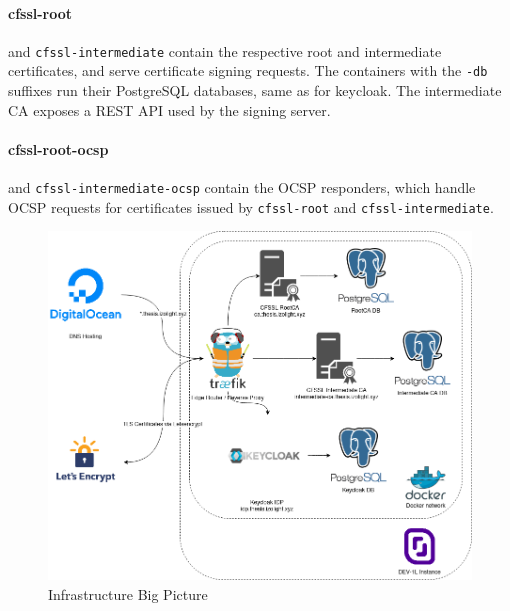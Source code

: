 \paragraph{cfssl-root} and \texttt{cfssl-intermediate} contain the respective root and intermediate certificates,
and serve certificate signing requests.
The containers with the \texttt{-db} suffixes run their PostgreSQL databases, same as for keycloak.
The intermediate \gls{CA} exposes a \gls{REST} \gls{API} used by the signing server.
\paragraph{cfssl-root-ocsp} and \texttt{cfssl-intermediate-ocsp} contain the \gls{OCSP} responders,
which handle \gls{OCSP} requests for certificates issued by \texttt{cfssl-root} and \texttt{cfssl-intermediate}.

\begin{figure}
    \includegraphics[width=0.9\linewidth]{images/infrastructure.png}
    \caption{Infrastructure Big Picture}
    \label{fig:infrastructurebigpicture}
\end{figure}

